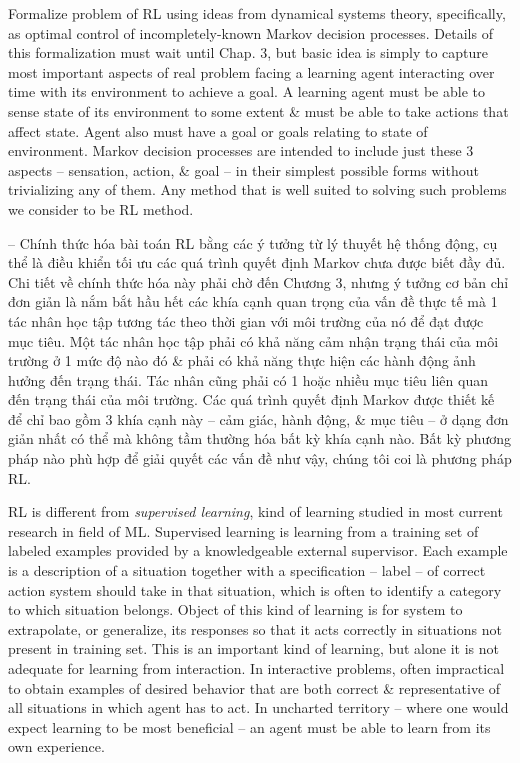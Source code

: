 \documentclass{article}
\begin{document}
\begin{itemize}
\begin{itemize}
        Formalize problem of RL using ideas from dynamical systems theory, specifically, as optimal control of incompletely-known Markov decision processes. Details of this formalization must wait until Chap. 3, but basic idea is simply to capture most important aspects of real problem facing a learning agent interacting over time with its environment to achieve a goal. A learning agent must be able to sense state of its environment to some extent \& must be able to take actions that affect state. Agent also must have a goal or goals relating to state of environment. Markov decision processes are intended to include just these 3 aspects -- sensation, action, \& goal -- in their simplest possible forms without trivializing any of them. Any method that is well suited to solving such problems we consider to be RL method.

        -- Chính thức hóa bài toán RL bằng các ý tưởng từ lý thuyết hệ thống động, cụ thể là điều khiển tối ưu các quá trình quyết định Markov chưa được biết đầy đủ. Chi tiết về chính thức hóa này phải chờ đến Chương 3, nhưng ý tưởng cơ bản chỉ đơn giản là nắm bắt hầu hết các khía cạnh quan trọng của vấn đề thực tế mà 1 tác nhân học tập tương tác theo thời gian với môi trường của nó để đạt được mục tiêu. Một tác nhân học tập phải có khả năng cảm nhận trạng thái của môi trường ở 1 mức độ nào đó \& phải có khả năng thực hiện các hành động ảnh hưởng đến trạng thái. Tác nhân cũng phải có 1 hoặc nhiều mục tiêu liên quan đến trạng thái của môi trường. Các quá trình quyết định Markov được thiết kế để chỉ bao gồm 3 khía cạnh này -- cảm giác, hành động, \& mục tiêu -- ở dạng đơn giản nhất có thể mà không tầm thường hóa bất kỳ khía cạnh nào. Bất kỳ phương pháp nào phù hợp để giải quyết các vấn đề như vậy, chúng tôi coi là phương pháp RL.

        RL is different from {\it supervised learning}, kind of learning studied in most current research in field of ML. Supervised learning is learning from a training set of labeled examples provided by a knowledgeable external supervisor. Each example is a description of a situation together with a specification -- label -- of correct action system should take in that situation, which is often to identify a category to which situation belongs. Object of this kind of learning is for system to extrapolate, or generalize, its responses so that it acts correctly in situations not present in training set. This is an important kind of learning, but alone it is not adequate for learning from interaction. In interactive problems, often impractical to obtain examples of desired behavior that are both correct \& representative of all situations in which agent has to act. In uncharted territory -- where one would expect learning to be most beneficial -- an agent must be able to learn from its own experience.


\end{itemize}
\end{itemize}
\end{document}
